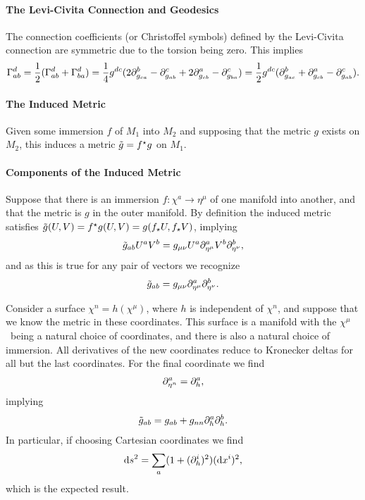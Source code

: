 \paragraph{The Levi-Civita Connection and Geodesics}
The connection coefficients (or Christoffel symbols) defined by the Levi-Civita connection are symmetric due to the torsion being zero. This implies
\begin{align*}
	\chris{d}{a}{b} = \frac{1}{2}(\chris{d}{a}{b} + \chris{d}{b}{a}) = \frac{1}{4}g^{dc}(2\del{b}{g_{ca}} - \del{c}{g_{ab}} + 2\del{a}{g_{cb}} - \del{c}{g_{ba}}) = \frac{1}{2}g^{dc}(\del{b}{g_{ac}} + \del{a}{g_{cb}} - \del{c}{g_{ab}}).
\end{align*}

\paragraph{The Induced Metric}
Given some immersion $f$ of $M_{1}$ into $M_{2}$ and supposing that the metric $g$ exists on $M_{2}$, this induces a metric $\tilde{g} = f^{\star}g$ on $M_{1}$.

\paragraph{Components of the Induced Metric}
Suppose that there is an immersion $f: \chi^{a}\to\eta^{\mu}$ of one manifold into another, and that the metric is $g$ in the outer manifold. By definition the induced metric satisfies $\tilde{g}(U, V) = f^{\star}g(U, V) = g(f_{\star}U, f_{\star}V)$, implying
\begin{align*}
	\tilde{g}_{ab}U^{a}V^{b} = g_{\mu\nu}U^{a}\partial^{a}_{\eta^{\mu}}V^{b}\partial^{b}_{\eta^{\nu}},
\end{align*}
and as this is true for any pair of vectors we recognize
\begin{align*}
	\tilde{g}_{ab} = g_{\mu\nu}\partial^{a}_{\eta^{\mu}}\partial^{b}_{\eta^{\nu}}.
\end{align*}

Consider a surface $\chi^{n} = h(\chi^{\mu})$, where $h$ is independent of $\chi^{n}$, and suppose that we know the metric in these coordinates. This surface is a manifold with the $\chi^{\mu}$ being a natural choice of coordinates, and there is also a natural choice of immersion. All derivatives of the new coordinates reduce to Kronecker deltas for all but the last coordinates. For the final coordinate we find
\begin{align*}
	\partial^{a}_{\eta^{n}} = \partial^{a}_{h},
\end{align*}
implying
\begin{align*}
	\tilde{g}_{ab} = g_{ab} + g_{nn}\partial^{a}_{h}\partial^{b}_{h}.
\end{align*}
In particular, if choosing Cartesian coordinates we find
\begin{align*}
	\dd{s}^{2} = \sum\limits_{a}(1 + (\partial^{i}_{h})^{2})(\dd{x}^{i})^{2},
\end{align*}
which is the expected result.


